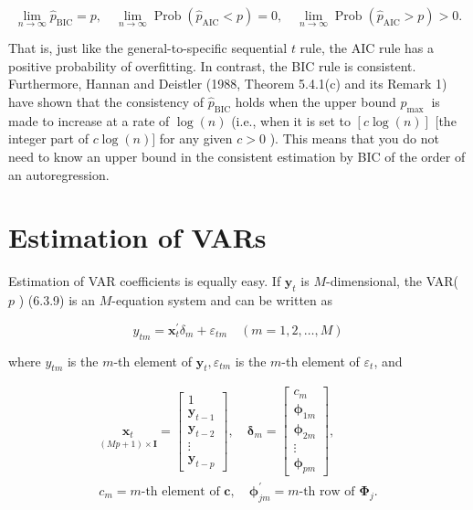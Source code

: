 \documentclass[10pt]{article}
\begin{document}
\begin{equation*}
\lim _{n \rightarrow \infty} \hat{p}_{\mathrm{BIC}}=p, \quad \lim _{n \rightarrow \infty} \operatorname{Prob}\left(\hat{p}_{\mathrm{AIC}}<p\right)=0, \quad \lim _{n \rightarrow \infty} \operatorname{Prob}\left(\hat{p}_{\mathrm{AIC}}>p\right)>0 . \tag{6.4.8}
\end{equation*}


That is, just like the general-to-specific sequential $t$ rule, the AIC rule has a positive probability of overfitting. In contrast, the BIC rule is consistent. Furthermore, Hannan and Deistler (1988, Theorem 5.4.1(c) and its Remark 1) have shown that the consistency of $\hat{p}_{\mathrm{BIC}}$ holds when the upper bound $p_{\text {max }}$ is made to increase at a rate of $\log (n)$ (i.e., when it is set to $[c \log (n)]$ [the integer part of $c \log (n)]$ for any given $c>0$ ). This means that you do not need to know an upper bound in the consistent estimation by BIC of the order of an autoregression.

\section*{Estimation of VARs}
Estimation of VAR coefficients is equally easy. If $\mathbf{y}_{t}$ is $M$-dimensional, the VAR( $p$ ) (6.3.9) is an $M$-equation system and can be written as


\begin{equation*}
y_{t m}=\mathbf{x}_{t}^{\prime} \delta_{m}+\varepsilon_{t m} \quad(m=1,2, \ldots, M) \tag{6.4.9}
\end{equation*}


where $y_{t m}$ is the $m$-th element of $\mathbf{y}_{t}, \varepsilon_{t m}$ is the $m$-th element of $\varepsilon_{t}$, and

$$
\begin{gathered}
\underset{(M p+1) \times \mathbf{I}}{\mathbf{x}_{t}}=\left[\begin{array}{c}
1 \\
\mathbf{y}_{t-1} \\
\mathbf{y}_{t-2} \\
\vdots \\
\mathbf{y}_{t-p}
\end{array}\right], \quad \boldsymbol{\delta}_{m}=\left[\begin{array}{c}
c_{m} \\
\boldsymbol{\phi}_{1 m} \\
\boldsymbol{\phi}_{2 m} \\
\vdots \\
\boldsymbol{\phi}_{p m}
\end{array}\right], \\
c_{m}=m \text {-th element of } \mathbf{c}, \quad \boldsymbol{\phi}_{j m}^{\prime}=m \text {-th row of } \mathbf{\Phi}_{j} .
\end{gathered}
$$
\end{document}

